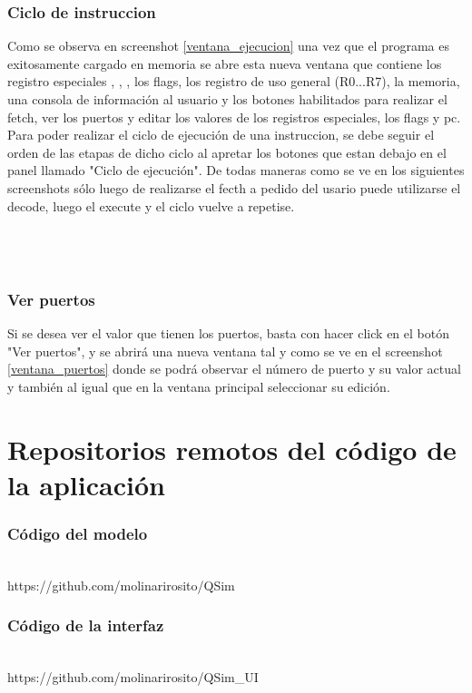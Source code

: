 \subsubsection{Ciclo de instruccion}
Como se observa en screenshot \ref{ventana_ejecucion} una vez que el programa es exitosamente cargado en memoria se abre esta nueva ventana que contiene los registro especiales \PC, \IR, \SP, los flags, los registro de uso general (R0...R7), la memoria, una consola de información al usuario y los botones habilitados para realizar el fetch, ver los puertos y editar los valores de los registros especiales, los flags y pc.
\\
Para poder realizar el ciclo de ejecución de una instruccion, se debe seguir el orden de las etapas de dicho ciclo al apretar los botones que estan debajo en el panel llamado "Ciclo de ejecución". De todas maneras como se ve en los siguientes screenshots sólo luego de realizarse el fecth a pedido del usario puede utilizarse el decode, luego el execute y el ciclo vuelve a repetise.\\

\\
\\
\\

\subsubsection{Ver puertos}
Si se desea ver el valor que tienen los puertos, basta con hacer click en el botón "Ver puertos", y se abrirá una nueva ventana tal y como se ve en el screenshot \ref{ventana_puertos} donde se podrá observar el número de puerto y su valor actual y también al igual que en la ventana principal seleccionar su edición.
\\


\section{Repositorios remotos del código de la aplicación}

\subsubsection{Código del modelo}\\
https://github.com/molinarirosito/QSim

\subsubsection{Código de la interfaz}\\
https://github.com/molinarirosito/QSim_UI
